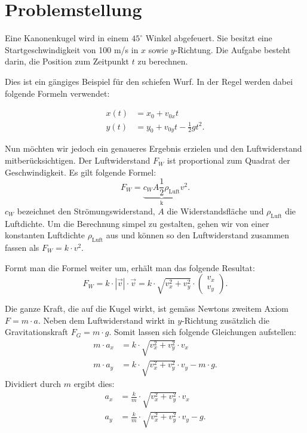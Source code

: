 \section{Problemstellung
\label{perturbation:section:problemstellung}}
Eine Kanonenkugel wird in einem $45^{\circ}$ Winkel abgefeuert.
Sie besitzt eine Startgeschwindigkeit von 100 m/s in $x$ sowie $y$-Richtung.
Die Aufgabe besteht darin, die Position zum Zeitpunkt $t$ zu berechnen.

Dies ist ein gängiges Beispiel für den schiefen Wurf.
In der Regel werden dabei folgende Formeln verwendet:

\begin{equation}\label{eq:x_simple}
\begin{aligned}
    x(t) &= x_0 + v_{0x}t\\
    y(t) &= y_0 + v_{0y}t - \frac{1}{2}gt^2.
\end{aligned}
\end{equation}


Nun möchten wir jedoch ein genaueres Ergebnis erzielen und den Luftwiderstand mitberücksichtigen.
Der Luftwiderstand $F_W$ ist proportional zum Quadrat der Geschwindigkeit.
Es gilt folgende Formel:
\[
F_W = \underbrace{c_WA\frac{1}{2}\rho_{\text{Luft}}}_\text{k}v^2.
\]
$c_W$ bezeichnet den Strömungswiderstand, $A$ die Widerstandsfläche und $\rho_{\text{Luft}}$ die Luftdichte.
Um die Berechnung simpel zu gestalten, gehen wir von einer konstanten Luftdichte $\rho_{\text{Luft}}$ aus und können so den Luftwiderstand zusammen fassen als $F_W = k \cdot v^2$.

Formt man die Formel weiter um, erhält man das folgende Resultat:
\[
F_W = k \cdot |\vec{v}| \cdot \vec{v} = k \cdot \sqrt{v_x^2 + v_y^2} \cdot \begin{pmatrix}v_x\\v_y\end{pmatrix}.
\]

Die ganze Kraft, die auf die Kugel wirkt, ist gemäss Newtons zweitem Axiom $F = m \cdot a$.
Neben dem Luftwiderstand wirkt in $y$-Richtung zusätzlich die Gravitationskraft $F_G = m \cdot g$.
Somit lassen sich folgende Gleichungen aufstellen:
\begin{align*}
m \cdot a_x &= k \cdot \sqrt{v_x^2 + v_y^2} \cdot v_x\\
m \cdot a_y &= k \cdot \sqrt{v_x^2 + v_y^2} \cdot v_y - m \cdot g.
\end{align*}
Dividiert durch $m$ ergibt dies:
\begin{align*}
a_x &= \frac{k}{m} \cdot \sqrt{v_x^2 + v_y^2} \cdot v_x\\
a_y &= \frac{k}{m} \cdot \sqrt{v_x^2 + v_y^2} \cdot v_y - g.
\end{align*}

